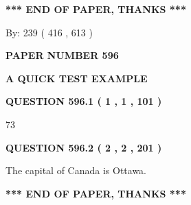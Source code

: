 \documentclass[12pt]{article}
\begin{document}
 
   
   
 \vspace{0.2in}
 
   
   
   
   
\vspace{1.0in} 
{\textbf{\large{ *** END OF PAPER, THANKS *** }}} 
   
   
\hspace{1.0in} By: 
 239 ( 416 ,  613 )
   
   
   
   
\newpage 
\setcounter{page}{ 
   596001 } 
   
   
   
   
 {\textbf{ \Large{ PAPER NUMBER  596  }}}
   
   
\vspace{0.2in}
   
   
   
   
   
   
 \vspace{0.2in}
{\LARGE {\textbf{ A QUICK TEST EXAMPLE}}}
   
   
  
\vspace{0.2in}
  
{\textbf{\Large{QUESTION
596.1 
 ( 1 , 1 , 101 )
}}}
  
  
 
 
\noindent{}

73
 
 
  
\vspace{0.2in}
  
{\textbf{\Large{QUESTION
596.2 
 ( 2 , 2 , 201 )
}}}
  
  
 
 
\noindent{}
 
 
The capital of Canada is Ottawa.
 
 
 
 
   
   
 \vspace{0.2in}
 
   
   
   
   
\vspace{1.0in} 
{\textbf{\large{ *** END OF PAPER, THANKS *** }}} 
   
\end{document}
